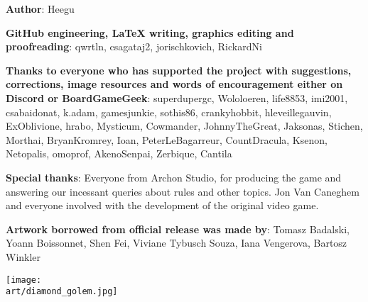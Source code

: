 
\bigbreak

\begin{multicols*}{2}

\textbf{Author}: Heegu\par
\textbf{GitHub engineering, LaTeX writing, graphics editing and proofreading}: qwrtln, csagataj2, jorischkovich, RickardNi\par
\textbf{Thanks to everyone who has supported the project with suggestions, corrections, image resources and words of encouragement either on Discord or BoardGameGeek}: superdupergc, Wololoeren, life8853, imi2001, csabaidonat, k.adam, gamesjunkie, sothis86, cranky\textunderscore hobbit, hleveillegauvin, ExOblivione, hrabo, Mysticum, Cowmander, JohnnyTheGreat, Jaksonas, Stichen, Morthai, BryanKromrey, Ioan, PeterLeBagarreur, \textunderscore Count\textunderscore Dracula\textunderscore , \space Ksenon, Netopalis, omoprof, AkenoSenpai, Zerbique, Cantila\par
\textbf{Special thanks}: Everyone from Archon Studio, for producing the game and answering our incessant queries about rules and other topics.
Jon Van Caneghem and everyone involved with the development of the original video game.\par
\textbf{Artwork borrowed from official release was made by}: Tomasz Badalski, Yoann Boissonnet, Shen Fei, Viviane Tybusch Souza, Iana Vengerova, Bartosz Winkler

\columnbreak

\texttt{[image: \\art/diamond\_golem.jpg]}

\end{multicols*}
